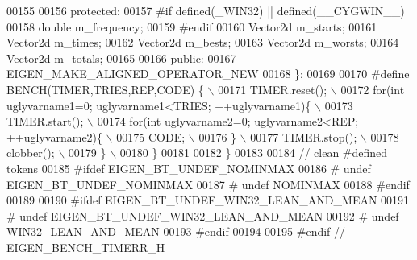 \begin{DoxyCode}
00155 
00156 \textcolor{keyword}{protected}:
00157 \textcolor{preprocessor}{#if defined(\_WIN32) || defined(\_\_CYGWIN\_\_)}
00158   \textcolor{keywordtype}{double} m\_frequency;
00159 \textcolor{preprocessor}{#endif}
00160   Vector2d m\_starts;
00161   Vector2d m\_times;
00162   Vector2d m\_bests;
00163   Vector2d m\_worsts;
00164   Vector2d m\_totals;
00165 
00166 \textcolor{keyword}{public}:
00167   EIGEN\_MAKE\_ALIGNED\_OPERATOR\_NEW
00168 \};
00169 
00170 \textcolor{preprocessor}{#define BENCH(TIMER,TRIES,REP,CODE) \{ \(\backslash\)}
00171 \textcolor{preprocessor}{    TIMER.reset(); \(\backslash\)}
00172 \textcolor{preprocessor}{    for(int uglyvarname1=0; uglyvarname1<TRIES; ++uglyvarname1)\{ \(\backslash\)}
00173 \textcolor{preprocessor}{      TIMER.start(); \(\backslash\)}
00174 \textcolor{preprocessor}{      for(int uglyvarname2=0; uglyvarname2<REP; ++uglyvarname2)\{ \(\backslash\)}
00175 \textcolor{preprocessor}{        CODE; \(\backslash\)}
00176 \textcolor{preprocessor}{      \} \(\backslash\)}
00177 \textcolor{preprocessor}{      TIMER.stop(); \(\backslash\)}
00178 \textcolor{preprocessor}{      clobber(); \(\backslash\)}
00179 \textcolor{preprocessor}{    \} \(\backslash\)}
00180 \textcolor{preprocessor}{  \}}
00181 
00182 \}
00183 
00184 \textcolor{comment}{// clean #defined tokens}
00185 \textcolor{preprocessor}{#ifdef EIGEN\_BT\_UNDEF\_NOMINMAX}
00186 \textcolor{preprocessor}{# undef EIGEN\_BT\_UNDEF\_NOMINMAX}
00187 \textcolor{preprocessor}{# undef NOMINMAX}
00188 \textcolor{preprocessor}{#endif}
00189 
00190 \textcolor{preprocessor}{#ifdef EIGEN\_BT\_UNDEF\_WIN32\_LEAN\_AND\_MEAN}
00191 \textcolor{preprocessor}{# undef EIGEN\_BT\_UNDEF\_WIN32\_LEAN\_AND\_MEAN}
00192 \textcolor{preprocessor}{# undef WIN32\_LEAN\_AND\_MEAN}
00193 \textcolor{preprocessor}{#endif}
00194 
00195 \textcolor{preprocessor}{#endif // EIGEN\_BENCH\_TIMERR\_H}
\end{DoxyCode}
